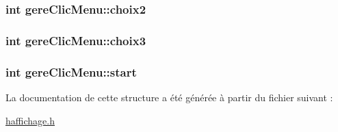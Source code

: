 \subsubsection[{\texorpdfstring{choix2}{choix2}}]{\setlength{\rightskip}{0pt plus 5cm}int gere\+Clic\+Menu\+::choix2}\hypertarget{structgere_clic_menu_a8d7e49218199a1e5727244bb54a6ea74}{}\label{structgere_clic_menu_a8d7e49218199a1e5727244bb54a6ea74}
\subsubsection[{\texorpdfstring{choix3}{choix3}}]{\setlength{\rightskip}{0pt plus 5cm}int gere\+Clic\+Menu\+::choix3}\hypertarget{structgere_clic_menu_a66206c4eca6d59ab569ec9a6cb6349fb}{}\label{structgere_clic_menu_a66206c4eca6d59ab569ec9a6cb6349fb}
\subsubsection[{\texorpdfstring{start}{start}}]{\setlength{\rightskip}{0pt plus 5cm}int gere\+Clic\+Menu\+::start}\hypertarget{structgere_clic_menu_a25e04719e259bfc4a4219eb8532d10a3}{}\label{structgere_clic_menu_a25e04719e259bfc4a4219eb8532d10a3}


La documentation de cette structure a été générée à partir du fichier suivant \+:\begin{DoxyCompactItemize}
\item 
\hyperlink{haffichage_8h}{haffichage.\+h}\end{DoxyCompactItemize}
